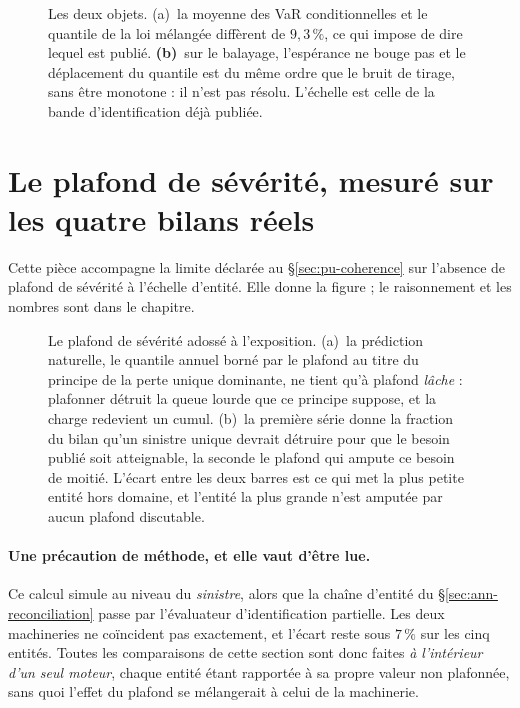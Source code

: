 \begin{figure}[htbp]\centering
{}
\caption{Les deux objets. (a)~la moyenne des VaR conditionnelles et le quantile de la
loi mélangée diffèrent de $9{,}3\,\%$, ce qui impose de dire lequel est publié.
\textbf{(b)}~sur le balayage, l'espérance ne bouge pas et le déplacement du quantile est du même
ordre que le bruit de tirage, sans être monotone : il n'est pas résolu. L'échelle est celle de la
bande d'identification déjà publiée.}
\label{fig:var-melange}
\end{figure}

\section{Le plafond de sévérité, mesuré sur les quatre bilans réels}
\label{sec:ann-plafond}


Cette pièce accompagne la limite déclarée au \S\ref{sec:pu-coherence} sur l'absence de plafond de
sévérité à l'échelle d'entité. Elle donne la figure ; le raisonnement et les nombres sont dans le
chapitre.

\begin{figure}[htbp]\centering
{}
\caption{Le plafond de sévérité adossé à l'exposition. (a)~la prédiction naturelle, le
quantile annuel borné par le plafond au titre du principe de la perte unique dominante, ne tient
qu'à plafond \emph{lâche} : plafonner détruit la queue lourde que ce principe suppose, et la
charge redevient un cumul. (b)~la première série donne la fraction du bilan qu'un sinistre
unique devrait détruire pour que le besoin publié soit atteignable, la seconde le plafond qui
ampute ce besoin de moitié. L'écart entre les deux barres est ce qui met la plus petite entité hors
domaine, et l'entité la plus grande n'est amputée par aucun plafond discutable.}
\label{fig:plafond-exposition}
\end{figure}

\paragraph{Une précaution de méthode, et elle vaut d'être lue.} Ce calcul simule au niveau du
\emph{sinistre}, alors que la chaîne d'entité du \S\ref{sec:ann-reconciliation} passe par
l'évaluateur d'identification partielle. Les deux machineries ne coïncident pas exactement, et
l'écart reste sous $7\,\%$ sur les cinq entités. Toutes les comparaisons de cette section sont
donc faites \emph{à l'intérieur d'un seul moteur}, chaque entité étant rapportée à sa propre
valeur non plafonnée, sans quoi l'effet du plafond se mélangerait à celui de la machinerie.

